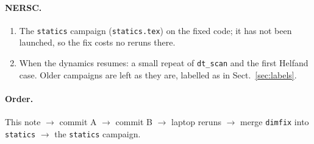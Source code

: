 \documentclass[11pt,aps,preprint,nofootinbib,superscriptaddress,tightenlines]{revtex4-2}
\def\Sect#1{Sect.~\ref{#1}}
\let\oldparagraph\paragraph
\renewcommand{\paragraph}{\par\bigskip\oldparagraph}
\begin{document}
\paragraph{NERSC.}
\begin{enumerate}
\item The \texttt{statics} campaign (\texttt{statics.tex}) on the fixed code; it has not been launched, so the fix costs no reruns there.
\item When the dynamics resumes: a small repeat of \texttt{dt\_scan} and the first Helfand case.  Older campaigns are left as they are,
  labelled as in \Sect{sec:labels}.
\end{enumerate}

\paragraph{Order.}  This note $\to$ commit A $\to$ commit B $\to$ laptop reruns $\to$ merge \texttt{dimfix} into \texttt{statics}
$\to$ the \texttt{statics} campaign.
\end{document}
